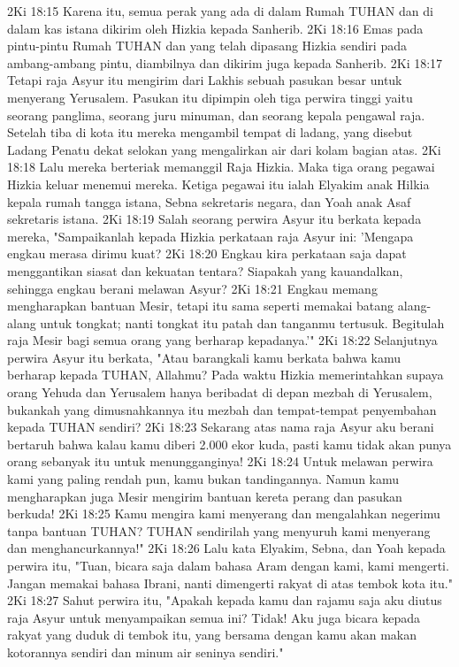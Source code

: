 2Ki 18:15  Karena itu, semua perak yang ada di dalam Rumah TUHAN dan di dalam kas istana dikirim oleh Hizkia kepada Sanherib.
2Ki 18:16  Emas pada pintu-pintu Rumah TUHAN dan yang telah dipasang Hizkia sendiri pada ambang-ambang pintu, diambilnya dan dikirim juga kepada Sanherib.
2Ki 18:17  Tetapi raja Asyur itu mengirim dari Lakhis sebuah pasukan besar untuk menyerang Yerusalem. Pasukan itu dipimpin oleh tiga perwira tinggi yaitu seorang panglima, seorang juru minuman, dan seorang kepala pengawal raja. Setelah tiba di kota itu mereka mengambil tempat di ladang, yang disebut Ladang Penatu dekat selokan yang mengalirkan air dari kolam bagian atas.
2Ki 18:18  Lalu mereka berteriak memanggil Raja Hizkia. Maka tiga orang pegawai Hizkia keluar menemui mereka. Ketiga pegawai itu ialah Elyakim anak Hilkia kepala rumah tangga istana, Sebna sekretaris negara, dan Yoah anak Asaf sekretaris istana.
2Ki 18:19  Salah seorang perwira Asyur itu berkata kepada mereka, "Sampaikanlah kepada Hizkia perkataan raja Asyur ini: 'Mengapa engkau merasa dirimu kuat?
2Ki 18:20  Engkau kira perkataan saja dapat menggantikan siasat dan kekuatan tentara? Siapakah yang kauandalkan, sehingga engkau berani melawan Asyur?
2Ki 18:21  Engkau memang mengharapkan bantuan Mesir, tetapi itu sama seperti memakai batang alang-alang untuk tongkat; nanti tongkat itu patah dan tanganmu tertusuk. Begitulah raja Mesir bagi semua orang yang berharap kepadanya.'"
2Ki 18:22  Selanjutnya perwira Asyur itu berkata, "Atau barangkali kamu berkata bahwa kamu berharap kepada TUHAN, Allahmu? Pada waktu Hizkia memerintahkan supaya orang Yehuda dan Yerusalem hanya beribadat di depan mezbah di Yerusalem, bukankah yang dimusnahkannya itu mezbah dan tempat-tempat penyembahan kepada TUHAN sendiri?
2Ki 18:23  Sekarang atas nama raja Asyur aku berani bertaruh bahwa kalau kamu diberi 2.000 ekor kuda, pasti kamu tidak akan punya orang sebanyak itu untuk menungganginya!
2Ki 18:24  Untuk melawan perwira kami yang paling rendah pun, kamu bukan tandingannya. Namun kamu mengharapkan juga Mesir mengirim bantuan kereta perang dan pasukan berkuda!
2Ki 18:25  Kamu mengira kami menyerang dan mengalahkan negerimu tanpa bantuan TUHAN? TUHAN sendirilah yang menyuruh kami menyerang dan menghancurkannya!"
2Ki 18:26  Lalu kata Elyakim, Sebna, dan Yoah kepada perwira itu, "Tuan, bicara saja dalam bahasa Aram dengan kami, kami mengerti. Jangan memakai bahasa Ibrani, nanti dimengerti rakyat di atas tembok kota itu."
2Ki 18:27  Sahut perwira itu, "Apakah kepada kamu dan rajamu saja aku diutus raja Asyur untuk menyampaikan semua ini? Tidak! Aku juga bicara kepada rakyat yang duduk di tembok itu, yang bersama dengan kamu akan makan kotorannya sendiri dan minum air seninya sendiri."
